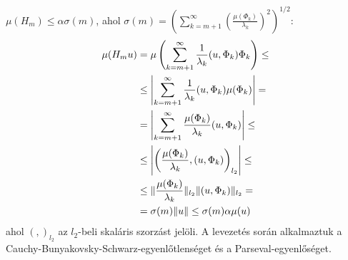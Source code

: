 \documentclass[oneside, titlepage, 12pt, a4paper]{report}
\DeclarePairedDelimiter\norm{\lVert}{\rVert}	%
\begin{document}
$\mu(H_m) \leq \alpha \sigma(m)$, ahol $\sigma(m) = \left(\sum_{k = m+1}^\infty \left( \frac{\mu(\Phi_k)}{\lambda_k}\right)^2\right)^{1/2}$:
\begin{align*}
\mu(H_m u) &= \mu \left( \sum_{k = m+1}^\infty \frac{1}{\lambda_k} (u, \Phi_k) \Phi_k \right) \leq \\
 &\leq \left| \sum_{k = m+1}^\infty \frac{1}{\lambda_k} (u, \Phi_k) \mu(\Phi_k) \right| = \\
 &= \left| \sum_{k = m+1}^\infty \frac{\mu(\Phi_k)}{\lambda_k} (u, \Phi_k) \right| \leq \\
 &\leq \left| \left( \frac{\mu(\Phi_k)}{\lambda_k}, (u, \Phi_k) \right)_{l_2} \right| \leq \\
 &\leq \norm{\frac{\mu(\Phi_k)}{\lambda_k}}_{l_2} \norm{(u, \Phi_k)}_{l_2} = \\
 &= \sigma(m) \norm{u} \leq \sigma(m) \alpha \mu(u)
\end{align*}
ahol $\left( , \right)_{l_2}$ az $l_2$-beli skaláris szorzást jelöli. A levezetés során alkalmaztuk a Cauchy-Bunyakovsky-Schwarz-egyenlőtlenséget és a Parseval-egyenlőséget.



 

 
\end{document}
